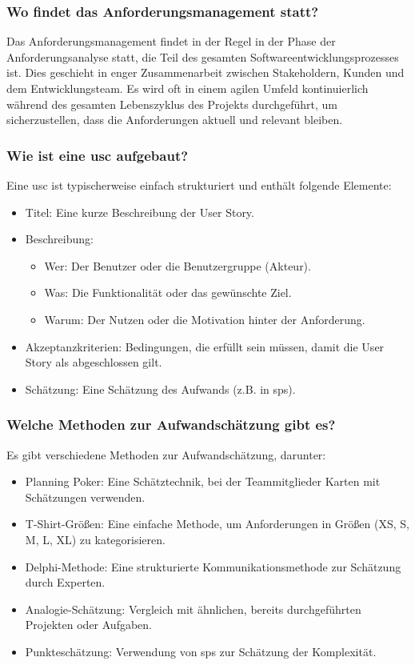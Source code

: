 \documentclass[main.tex]{subfiles}
\begin{document}
\subsubsection*{Wo findet das Anforderungsmanagement statt?}
Das Anforderungsmanagement findet in der Regel in der Phase der Anforderungsanalyse statt, die Teil des gesamten Softwareentwicklungsprozesses ist. Dies geschieht in enger Zusammenarbeit zwischen Stakeholdern, Kunden und dem Entwicklungsteam. Es wird oft in einem agilen Umfeld kontinuierlich während des gesamten Lebenszyklus des Projekts durchgeführt, um sicherzustellen, dass die Anforderungen aktuell und relevant bleiben.

\subsubsection*{Wie ist eine \gls{usc} aufgebaut?}
Eine \gls{usc} ist typischerweise einfach strukturiert und enthält folgende Elemente:
\begin{itemize}
    \item Titel: Eine kurze Beschreibung der \gls{User Story}.
    \item Beschreibung: 
    \begin{itemize}
        \item Wer: Der Benutzer oder die Benutzergruppe (Akteur).
        \item Was: Die Funktionalität oder das gewünschte Ziel.
        \item Warum: Der Nutzen oder die Motivation hinter der Anforderung.
    \end{itemize}
    \item Akzeptanzkriterien: Bedingungen, die erfüllt sein müssen, damit die \gls{User Story} als abgeschlossen gilt.
    \item Schätzung: Eine Schätzung des Aufwands (z.B. in \glspl{sp}).
\end{itemize}

\subsubsection*{Welche Methoden zur Aufwandschätzung gibt es?}
Es gibt verschiedene Methoden zur Aufwandschätzung, darunter:
\begin{itemize}
    \item \gls{Planning Poker}: Eine Schätztechnik, bei der Teammitglieder Karten mit Schätzungen verwenden.
    \item T-Shirt-Größen: Eine einfache Methode, um Anforderungen in Größen (XS, S, M, L, XL) zu kategorisieren.
    \item Delphi-Methode: Eine strukturierte Kommunikationsmethode zur Schätzung durch Experten.
    \item Analogie-Schätzung: Vergleich mit ähnlichen, bereits durchgeführten Projekten oder Aufgaben.
    \item Punkteschätzung: Verwendung von \glspl{sp} zur Schätzung der Komplexität.
\end{itemize}
\end{document}
